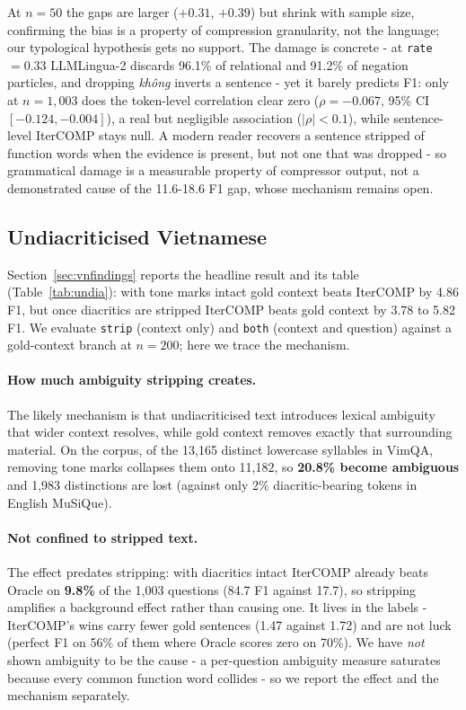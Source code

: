 \documentclass[11pt]{article}
\begin{document}
At $n=50$ the gaps are larger ($+0.31$, $+0.39$) but shrink with sample size,
confirming the bias is a property of compression granularity, not the language;
our typological hypothesis gets no support. The damage is concrete - at
\texttt{rate}${}=0.33$ LLMLingua-2 discards 96.1\% of relational and 91.2\% of
negation particles, and dropping \emph{kh\^ong} inverts a sentence - yet it
barely predicts F1: only at $n=1{,}003$ does the token-level correlation clear
zero ($\rho=-0.067$, 95\% CI $[-0.124, -0.004]$), a real but negligible
association ($|\rho|<0.1$), while sentence-level IterCOMP stays null. A modern
reader recovers a sentence stripped of function words when the evidence is
present, but not one that was dropped - so grammatical damage is a measurable
property of compressor output, not a demonstrated cause of the 11.6-18.6 F1 gap,
whose mechanism remains open.

\subsection{Undiacriticised Vietnamese}
\label{app:undia}

Section~\ref{sec:vnfindings} reports the headline result and its table
(Table~\ref{tab:undia}): with tone marks intact gold context beats IterCOMP by
4.86 F1, but once diacritics are stripped IterCOMP beats gold context by 3.78 to
5.82 F1. We evaluate \texttt{strip} (context only) and \texttt{both} (context and
question) against a gold-context branch at $n=200$; here we trace the mechanism.

\paragraph{How much ambiguity stripping creates.} The likely mechanism is that
undiacriticised text introduces lexical ambiguity that wider context resolves,
while gold context removes exactly that surrounding material. On the corpus, of
the 13,165 distinct lowercase syllables in VimQA, removing tone marks collapses
them onto 11,182, so \textbf{20.8\% become ambiguous} and 1,983 distinctions are
lost (against only 2\% diacritic-bearing tokens in English MuSiQue).
\paragraph{Not confined to stripped text.} The effect predates stripping: with
diacritics intact IterCOMP already beats Oracle on \textbf{9.8\%} of the 1,003
questions (84.7 F1 against 17.7), so stripping amplifies a background effect
rather than causing one. It lives in the labels - IterCOMP's wins carry fewer
gold sentences (1.47 against 1.72) and are not luck (perfect F1 on 56\% of them
where Oracle scores zero on 70\%). We have \emph{not} shown ambiguity to be the
cause - a per-question ambiguity measure saturates because every common function
word collides - so we report the effect and the mechanism separately.
\end{document}
